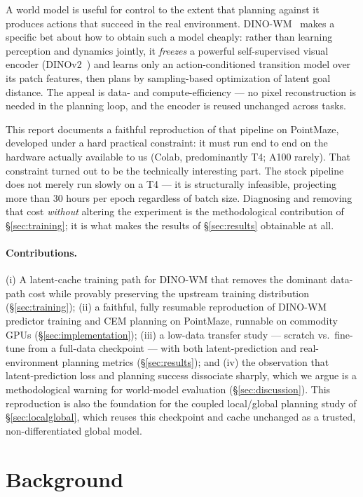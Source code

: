 \documentclass[11pt,a4paper]{article}
\begin{document}
A world model is useful for control to the extent that planning against it
produces actions that succeed in the real environment. DINO-WM~\cite{dinowm2025}
makes a specific bet about how to obtain such a model cheaply: rather than
learning perception and dynamics jointly, it \emph{freezes} a powerful
self-supervised visual encoder (DINOv2~\cite{dinov2}) and learns only an
action-conditioned transition model over its patch features, then plans by
sampling-based optimization of latent goal distance. The appeal is data- and
compute-efficiency --- no pixel reconstruction is needed in the planning loop,
and the encoder is reused unchanged across tasks.

This report documents a faithful reproduction of that pipeline on PointMaze,
developed under a hard practical constraint: it must run end to end on the
hardware actually available to us (Colab, predominantly T4; A100 rarely).
That constraint turned out to be the technically interesting part. The stock
pipeline does not merely run slowly on a T4 --- it is structurally infeasible,
projecting more than 30 hours per epoch regardless of batch size. Diagnosing
and removing that cost \emph{without} altering the experiment is the
methodological contribution of \S\ref{sec:training}; it is what makes the
results of \S\ref{sec:results} obtainable at all.

\paragraph{Contributions.} (i) A latent-cache training path for DINO-WM that
removes the dominant data-path cost while provably preserving the upstream
training distribution (\S\ref{sec:training}); (ii) a faithful, fully resumable
reproduction of DINO-WM predictor training and CEM planning on PointMaze,
runnable on commodity GPUs (\S\ref{sec:implementation}); (iii) a low-data
transfer study --- scratch vs.\ fine-tune from a full-data checkpoint --- with
both latent-prediction and real-environment planning metrics
(\S\ref{sec:results}); and (iv) the observation that latent-prediction loss
and planning success dissociate sharply, which we argue is a methodological
warning for world-model evaluation (\S\ref{sec:discussion}). This reproduction
is also the foundation for the coupled local/global planning study of
\S\ref{sec:localglobal}, which reuses this checkpoint and cache unchanged as a
trusted, non-differentiated global model.

\section{Background}
\label{sec:background}
\end{document}
